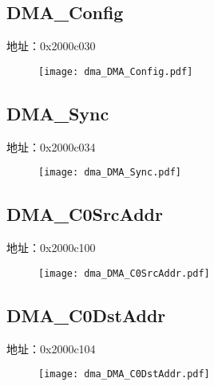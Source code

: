 \subsection{DMA\_Config}
\label{dma-DMA-Config}
地址：0x2000c030
 \begin{figure}[H]
\texttt{[image: dma\_DMA\_Config.pdf]}
\end{figure}

\subsection{DMA\_Sync}
\label{dma-DMA-Sync}
地址：0x2000c034
 \begin{figure}[H]
\texttt{[image: dma\_DMA\_Sync.pdf]}
\end{figure}

\subsection{DMA\_C0SrcAddr}
\label{dma-DMA-C0SrcAddr}
地址：0x2000c100
 \begin{figure}[H]
\texttt{[image: dma\_DMA\_C0SrcAddr.pdf]}
\end{figure}

\subsection{DMA\_C0DstAddr}
\label{dma-DMA-C0DstAddr}
地址：0x2000c104
 \begin{figure}[H]
\texttt{[image: dma\_DMA\_C0DstAddr.pdf]}
\end{figure}

